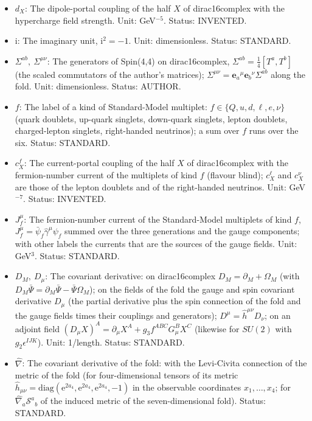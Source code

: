 \documentclass[
  10pt,
]{article}
\begin{document}
\begin{itemize}
  for \(X = \mathrm{R}\). Unit: dimensionless. Status: AUTHOR.
\item
  \(d_X\): The dipole-portal coupling of the half \(X\) of
  dirac16complex with the hypercharge field strength. Unit:
  GeV\(^{-5}\). Status: INVENTED.
\item
  \(\mathrm{i}\): The imaginary unit, \(\mathrm{i}^2 = -1\). Unit:
  dimensionless. Status: STANDARD.
\item
  \(\Sigma^{ab},\ \Sigma^{\mu\nu}\): The generators of Spin(4,4) on
  dirac16complex, \(\Sigma^{ab} = \frac14[T^a, T^b]\) (the scaled
  commutators of the author's matrices);
  \(\Sigma^{\mu\nu} = \mathbf{e}_a{}^\mu\mathbf{e}_b{}^\nu\Sigma^{ab}\)
  along the fold. Unit: dimensionless. Status: AUTHOR.
\item
  \(f\): The label of a kind of Standard-Model multiplet:
  \(f \in \{Q, u, d, \ell, e, \nu\}\) (quark doublets, up-quark
  singlets, down-quark singlets, lepton doublets, charged-lepton
  singlets, right-handed neutrinos); a sum over \(f\) runs over the six.
  Status: STANDARD.
\item
  \(c^{f}_X\): The current-portal coupling of the half \(X\) of
  dirac16complex with the fermion-number current of the multiplets of
  kind \(f\) (flavour blind); \(c^{\ell}_X\) and \(c^{\nu}_X\) are those
  of the lepton doublets and of the right-handed neutrinos. Unit:
  GeV\(^{-7}\). Status: INVENTED.
\item
  \(J_f^\mu\): The fermion-number current of the Standard-Model
  multiplets of kind \(f\), \(J_f^\mu = \bar\psi_f\hat\gamma^\mu\psi_f\)
  summed over the three generations and the gauge components; with other
  labels the currents that are the sources of the gauge fields. Unit:
  GeV\(^3\). Status: STANDARD.
\item
  \(D_M,\ D_\mu\): The covariant derivative: on dirac16complex
  \(D_M = \partial_M + \Omega_M\) (with
  \(D_M\bar\Psi = \partial_M\bar\Psi - \bar\Psi\Omega_M\)); on the
  fields of the fold the gauge and spin covariant derivative \(D_\mu\)
  (the partial derivative plus the spin connection of the fold and the
  gauge fields times their couplings and generators);
  \(D^\mu = \hat h^{\mu\nu}D_\nu\); on an adjoint field
  \((D_\mu X)^A = \partial_\mu X^A + g_3f^{ABC}G^B_\mu X^C\) (likewise
  for \(SU(2)\) with \(g_2\epsilon^{IJK}\)). Unit: 1/length. Status:
  STANDARD.
\item
  \(\hat\nabla\): The covariant derivative of the fold: with the
  Levi-Civita connection of the metric of the fold (for four-dimensional
  tensors of its metric
  \(\hat h_{\mu\nu} = \mathrm{diag}(\mathrm{e}^{2a_4}, \mathrm{e}^{2a_4}, \mathrm{e}^{2a_4}, -1)\)
  in the observable coordinates \(x_1, \dots, x_4\); for
  \(\hat\nabla_a\mathcal{S}^a{}_b\) of the induced metric of the
  seven-dimensional fold). Status: STANDARD.
\end{itemize}
\end{document}
